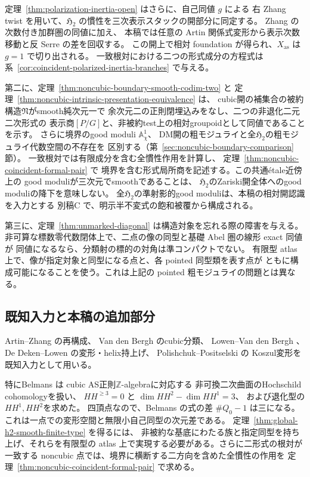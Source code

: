 \documentclass[a4paper,11pt]{ltjsarticle}
\numberwithin{equation}{section}
\theoremstyle{plain}
\theoremstyle{definition}
\theoremstyle{remark}
\newcommand{\HHstack}{\mathfrak H_2}
\begin{document}
定理~\ref{thm:polarization-inertia-open} はさらに、自己同値 $g$ による
右 Zhang twist を用いて、$\HHstack$ の慣性を三次表示スタックの開部分に同定する。
Zhang \cite[Theorem 3.1]{Zhang1996} の次数付き加群圏の同値に加え、
本稿では任意の Artin 関係式変形から表示次数移動と反 Serre の差を回収する。
この開上で相対 foundation が得られ、$X_{\mathrm{as}}$ は $g=1$ で切り出される。
一致根対における二つの形式成分の方程式は
系~\ref{cor:coincident-polarized-inertia-branches} で与える。

第二に、定理~\ref{thm:noncubic-boundary-smooth-codim-two} と
定理~\ref{thm:noncubic-intrinsic-presentation-equivalence} は、
cubic開の補集合の被約構造$\mathfrak N$がsmooth純次元一で
余次元二の正則閉埋込みをなし、二つの非退化二元二次形式の
表示商$[P/G]$と、非被約test上の相対groupoidとして同値であることを示す。
さらに境界のgood moduli $\mathbb A^1_\chi$、
DM開の粗モジュライと全$\HHstack$の粗モジュライ代数空間の不存在を
区別する（第~\ref{sec:noncubic-boundary-comparison}節）。
一致根対では有限成分を含む全慣性作用を計算し、
定理~\ref{thm:noncubic-coincident-formal-pair} で
境界を含む形式局所商を記述する。この共通étale近傍上の
good moduliが三次元でsmoothであることは、
$\HHstack$のZariski開全体へのgood moduliの降下を意味しない。
全$\HHstack$の準射影的good moduliは、本稿の相対開認識を入力とする
別稿C\cite[\texttt{thm:qa-global-h2-quasiprojective-good-moduli}]{QuiverAvatarModuli2026}
で、明示半不変式の飽和被覆から構成される。

第三に、定理~\ref{thm:unmarked-diagonal} は構造対象を忘れる際の障害を与える。
非可算な標数零代数閉体上で、二点の像の同型と基礎 Abel 圏の線形 exact 同値が
同値になるなら、分類射の標的の対角は準コンパクトでない。
有限型 atlas 上で、像が指定対象と同型になる点と、各 pointed 同型類を表す点が
ともに構成可能になることを使う。これは上記の pointed 粗モジュライの問題とは異なる。

\subsection{既知入力と本稿の追加部分}
Artin--Zhang \cite{AZ1994} の再構成、
Van den Bergh \cite{VdB2011} のcubic分類、
Lowen--Van den Bergh \cite{LowenVanDenBergh2005,LowenVanDenBergh2006}、
De Deken--Lowen \cite{DeDekenLowen2011} の変形・helix持上げ、
Polishchuk--Positselski \cite{PolishchukPositselski2005} の
Koszul変形を既知入力として用いる。

特にBelmans \cite[Proposition 31, Corollary 32, Table 2]{Belmans2019} は
cubic AS正則$\mathbb Z$-algebraに対応する
非可換二次曲面のHochschild cohomologyを扱い、
$HH^{\ge3}=0$ と $\dim HH^2-\dim HH^1=3$、
および退化型の$HH^1,HH^2$を求めた。
四頂点なので、Belmans の式の差 $\#Q_0-1$ は三になる。
これは一点での変形空間と無限小自己同型の次元差である。
定理~\ref{thm:global-h2-smooth-finite-type} を得るには、
非被約な基底にわたる族と指定同型を持ち上げ、それらを有限型の
atlas 上で実現する必要がある。さらに二形式の根対が一致する
noncubic 点では、境界に横断する二方向を含めた全慣性の作用を
定理~\ref{thm:noncubic-coincident-formal-pair} で求める。
\end{document}
